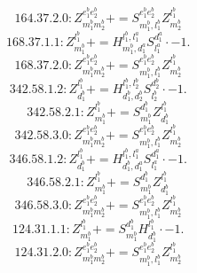\documentclass[letterpaper,10pt,fleqn,leqno,onecolumn]{article}
\begin{document}
\begin{equation} \;\;\;\;\;\;  164.37.2.0: Z^{e_{1}^{b}e_{2}^{b}}_{m_{1}^{b}m_{2}^{b}}+=S^{e_{1}^{b}e_{2}^{b}}_{m_{1}^{b},l_{1}^{b}}Z^{l_{1}^{b}}_{m_{2}^{b}} \end{equation}
\begin{equation} \;\;\;\;\;\;  168.37.1.1: Z^{l_{1}^{b}}_{m_{1}^{b}}+=H^{l_{1}^{b},l_{1}^{a}}_{m_{1}^{b},d_{1}^{a}}S^{d_{1}^{a}}_{l_{1}^{a}}\cdot -1. \end{equation}
\begin{equation} \;\;\;\;\;\;  168.37.2.0: Z^{e_{1}^{b}e_{2}^{b}}_{m_{1}^{b}m_{2}^{b}}+=S^{e_{1}^{b}e_{2}^{b}}_{m_{1}^{b},l_{1}^{b}}Z^{l_{1}^{b}}_{m_{2}^{b}} \end{equation}
\begin{equation} \;\;\;\;\;\;  342.58.1.2: Z^{l_{1}^{b}}_{d_{1}^{b}}+=H^{l_{1}^{b},l_{2}^{b}}_{d_{1}^{b},d_{2}^{b}}S^{d_{2}^{b}}_{l_{2}^{b}}\cdot -1. \end{equation}
\begin{equation} \;\;\;\;\;\;  342.58.2.1: Z^{l_{1}^{b}}_{m_{1}^{b}}+=S^{d_{1}^{b}}_{m_{1}^{b}}Z^{l_{1}^{b}}_{d_{1}^{b}} \end{equation}
\begin{equation} \;\;\;\;\;\;  342.58.3.0: Z^{e_{1}^{b}e_{2}^{b}}_{m_{1}^{b}m_{2}^{b}}+=S^{e_{1}^{b}e_{2}^{b}}_{m_{1}^{b},l_{1}^{b}}Z^{l_{1}^{b}}_{m_{2}^{b}} \end{equation}
\begin{equation} \;\;\;\;\;\;  346.58.1.2: Z^{l_{1}^{b}}_{d_{1}^{b}}+=H^{l_{1}^{b},l_{1}^{a}}_{d_{1}^{b},d_{1}^{a}}S^{d_{1}^{a}}_{l_{1}^{a}}\cdot -1. \end{equation}
\begin{equation} \;\;\;\;\;\;  346.58.2.1: Z^{l_{1}^{b}}_{m_{1}^{b}}+=S^{d_{1}^{b}}_{m_{1}^{b}}Z^{l_{1}^{b}}_{d_{1}^{b}} \end{equation}
\begin{equation} \;\;\;\;\;\;  346.58.3.0: Z^{e_{1}^{b}e_{2}^{b}}_{m_{1}^{b}m_{2}^{b}}+=S^{e_{1}^{b}e_{2}^{b}}_{m_{1}^{b},l_{1}^{b}}Z^{l_{1}^{b}}_{m_{2}^{b}} \end{equation}
\begin{equation} \;\;\;\;\;\;  124.31.1.1: Z^{l_{1}^{b}}_{m_{1}^{b}}+=S^{d_{1}^{b}}_{m_{1}^{b}}H^{l_{1}^{b}}_{d_{1}^{b}}\cdot -1. \end{equation}
\begin{equation} \;\;\;\;\;\;  124.31.2.0: Z^{e_{1}^{b}e_{2}^{b}}_{m_{1}^{b}m_{2}^{b}}+=S^{e_{1}^{b}e_{2}^{b}}_{m_{1}^{b},l_{1}^{b}}Z^{l_{1}^{b}}_{m_{2}^{b}} \end{equation}
\end{document}
